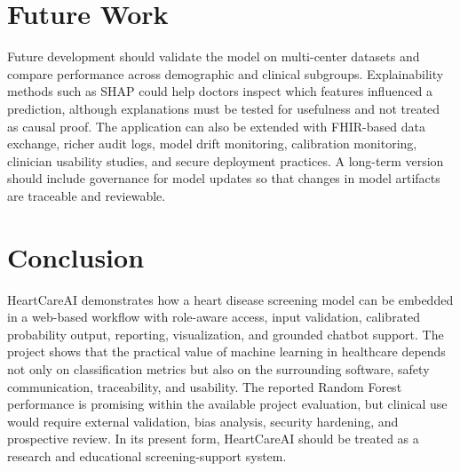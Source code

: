 \documentclass[conference]{IEEEtran}
\begin{document}
\section{Future Work}
Future development should validate the model on multi-center datasets and compare performance across demographic and clinical subgroups. Explainability methods such as SHAP could help doctors inspect which features influenced a prediction, although explanations must be tested for usefulness and not treated as causal proof. The application can also be extended with FHIR-based data exchange, richer audit logs, model drift monitoring, calibration monitoring, clinician usability studies, and secure deployment practices. A long-term version should include governance for model updates so that changes in model artifacts are traceable and reviewable.

\section{Conclusion}
HeartCareAI demonstrates how a heart disease screening model can be embedded in a web-based workflow with role-aware access, input validation, calibrated probability output, reporting, visualization, and grounded chatbot support. The project shows that the practical value of machine learning in healthcare depends not only on classification metrics but also on the surrounding software, safety communication, traceability, and usability. The reported Random Forest performance is promising within the available project evaluation, but clinical use would require external validation, bias analysis, security hardening, and prospective review. In its present form, HeartCareAI should be treated as a research and educational screening-support system.



\end{document}
